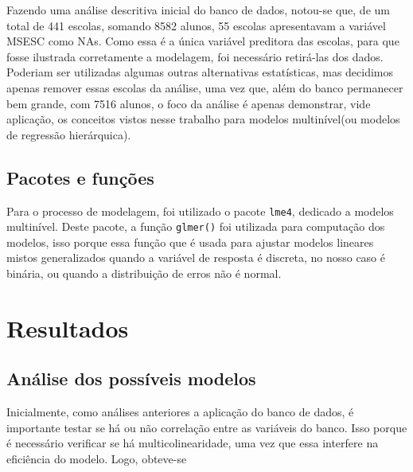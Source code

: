 \documentclass[
  letterpaper,
  DIV=11,
  numbers=noendperiod]{scrartcl}
\begin{document}
Fazendo uma análise descritiva inicial do banco de dados, notou-se que,
de um total de 441 escolas, somando 8582 alunos, 55 escolas apresentavam
a variável MSESC como NAs. Como essa é a única variável preditora das
escolas, para que fosse ilustrada corretamente a modelagem, foi
necessário retirá-las dos dados. Poderiam ser utilizadas algumas outras
alternativas estatísticas, mas decidimos apenas remover essas escolas da
análise, uma vez que, além do banco permanecer bem grande, com 7516
alunos, o foco da análise é apenas demonstrar, vide aplicação, os
conceitos vistos nesse trabalho para modelos multinível(ou modelos de
regressão hierárquica).

\hypertarget{pacotes-e-funuxe7uxf5es}{%
\subsection{Pacotes e funções}\label{pacotes-e-funuxe7uxf5es}}

Para o processo de modelagem, foi utilizado o pacote \texttt{lme4},
dedicado a modelos multinível. Deste pacote, a função \texttt{glmer()}
foi utilizada para computação dos modelos, isso porque essa função que é
usada para ajustar modelos lineares mistos generalizados quando a
variável de resposta é discreta, no nosso caso é binária, ou quando a
distribuição de erros não é normal.

\newpage{}

\hypertarget{resultados}{%
\section{Resultados}\label{resultados}}

\hypertarget{anuxe1lise-dos-possuxedveis-modelos}{%
\subsection{Análise dos possíveis
modelos}\label{anuxe1lise-dos-possuxedveis-modelos}}

Inicialmente, como análises anteriores a aplicação do banco de dados, é
importante testar se há ou não correlação entre as variáveis do banco.
Isso porque é necessário verificar se há multicolinearidade, uma vez que
essa interfere na eficiência do modelo. Logo, obteve-se
\end{document}
